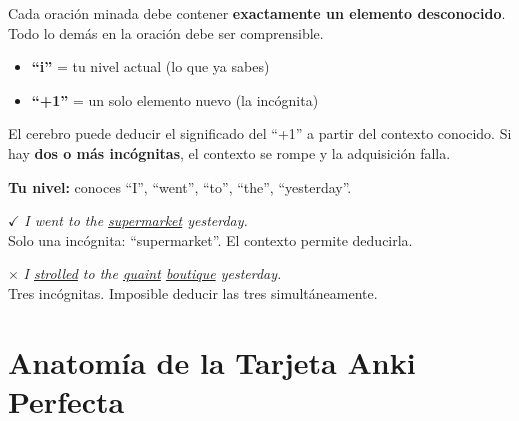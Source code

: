 \documentclass[12pt,a4paper]{article}
\begin{document}
\begin{cajamineria}
Cada oración minada debe contener \textbf{exactamente un elemento desconocido}. Todo lo demás en la oración debe ser comprensible.

\medskip
\begin{itemize}[leftmargin=1.2cm]
  \item \textbf{``i''} = tu nivel actual (lo que ya sabes)
  \item \textbf{``+1''} = un solo elemento nuevo (la incógnita)
\end{itemize}

\medskip
El cerebro puede deducir el significado del ``+1'' a partir del contexto conocido. Si hay \textbf{dos o más incógnitas}, el contexto se rompe y la adquisición falla.

\medskip
\begin{cajaejemplo}
\textbf{Tu nivel:} conoces ``I'', ``went'', ``to'', ``the'', ``yesterday''.

\medskip
$\checkmark$ \textit{I went to the \underline{supermarket} yesterday.}\\
{\small Solo una incógnita: ``supermarket''. El contexto permite deducirla.}

\medskip
$\times$ \textit{I \underline{strolled} to the \underline{quaint} \underline{boutique} yesterday.}\\
{\small Tres incógnitas. Imposible deducir las tres simultáneamente.}
\end{cajaejemplo}
\end{cajamineria}

\section{Anatomía de la Tarjeta Anki Perfecta}
\end{document}
